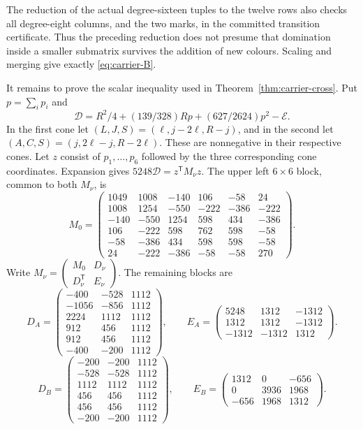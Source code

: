The reduction of the actual degree-sixteen tuples to the twelve rows
also checks all degree-eight columns, and the two marks, in the
committed transition certificate. Thus the preceding reduction does
not presume that domination inside a smaller submatrix survives the
addition of new colours. Scaling and merging give exactly
\eqref{eq:carrier-B}.

It remains to prove the scalar inequality used in
Theorem~\ref{thm:carrier-cross}. Put $p=\sum_i p_i$ and
\[
 \mathcal D=R^2/4+(139/328)Rp+(627/2624)p^2-\mathcal E.
\]
In the first cone let $(L,J,S)=(\ell,j-2\ell,R-j)$, and in the second
let $(A,C,S)=(j,2\ell-j,R-2\ell)$. These are nonnegative in their
respective cones. Let $z$ consist of $p_1,\ldots,p_6$ followed by the three
corresponding cone coordinates.
Expansion gives $5248\mathcal D=z^{\mathsf T}M_\nu z$.
The upper left $6\times6$ block, common to both $M_\nu$, is
\[
M_0=\begin{pmatrix}
1049&1008&-140&106&-58&24\\
1008&1254&-550&-222&-386&-222\\
-140&-550&1254&598&434&-386\\
106&-222&598&762&598&-58\\
-58&-386&434&598&598&-58\\
24&-222&-386&-58&-58&270
\end{pmatrix}.
\]
Write $M_\nu=\begin{pmatrix}M_0&D_\nu\\D_\nu^{\mathsf T}&E_\nu\end{pmatrix}$.
The remaining blocks are
\[
D_A=\begin{pmatrix}
-400&-528&1112\\
-1056&-856&1112\\
2224&1112&1112\\
912&456&1112\\
912&456&1112\\
-400&-200&1112
\end{pmatrix},\qquad E_A=\begin{pmatrix}
5248&1312&-1312\\
1312&1312&-1312\\
-1312&-1312&1312
\end{pmatrix}.
\]
\[
D_B=\begin{pmatrix}
-200&-200&1112\\
-528&-528&1112\\
1112&1112&1112\\
456&456&1112\\
456&456&1112\\
-200&-200&1112
\end{pmatrix},\qquad E_B=\begin{pmatrix}
1312&0&-656\\
0&3936&1968\\
-656&1968&1312
\end{pmatrix}.
\]
